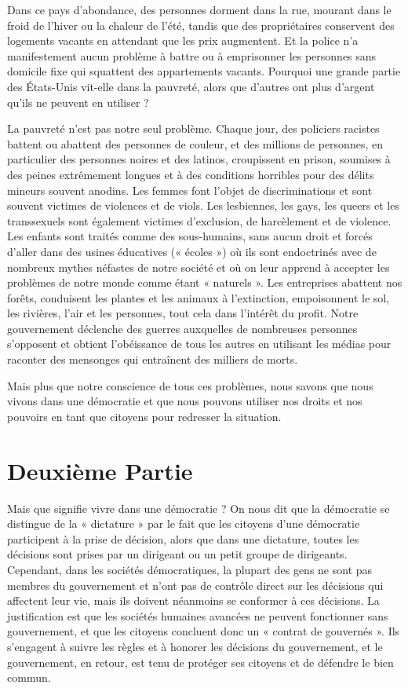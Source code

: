 Dans ce pays d'abondance, des personnes dorment dans la rue, mourant dans le froid de l'hiver ou la chaleur de l'été, tandis que des propriétaires conservent des logements vacants en attendant que les prix augmentent. Et la police n'a manifestement aucun problème à battre ou à emprisonner les personnes sans domicile fixe qui squattent des appartements vacants. Pourquoi une grande partie des États-Unis vit-elle dans la pauvreté, alors que d'autres ont plus d'argent qu'ils ne peuvent en utiliser ?

La pauvreté n'est pas notre seul problème. Chaque jour, des policiers racistes battent ou abattent des personnes de couleur, et des millions de personnes, en particulier des personnes noires et des latinos, croupissent en prison, soumises à des peines extrêmement longues et à des conditions horribles pour des délits mineurs souvent anodins. Les femmes font l'objet de discriminations et sont souvent victimes de violences et de viols. Les lesbiennes, les gays, les queers et les transsexuels sont également victimes d'exclusion, de harcèlement et de violence. Les enfants sont traités comme des sous-humains, sans aucun droit et forcés d'aller dans des usines éducatives (« écoles ») où ils sont endoctrinés avec de nombreux mythes néfastes de notre société et où on leur apprend à accepter les problèmes de notre monde comme étant « naturels ». Les entreprises abattent nos forêts, conduisent les plantes et les animaux à l'extinction, empoisonnent le sol, les rivières, l'air et les personnes, tout cela dans l'intérêt du profit. Notre gouvernement déclenche des guerres auxquelles de nombreuses personnes s'opposent et obtient l'obéissance de tous les autres en utilisant les médias pour raconter des mensonges qui entraînent des milliers de morts.

Mais plus que notre conscience de tous ces problèmes, nous savons que nous vivons dans une démocratie et que nous pouvons utiliser nos droits et nos pouvoirs en tant que citoyens pour redresser la situation.

\chapter*{\textbf{Deuxième Partie}}

Mais que signifie vivre dans une démocratie ? On nous dit que la démocratie se distingue de la « dictature » par le fait que les citoyens d'une démocratie participent à la prise de décision, alors que dans une dictature, toutes les décisions sont prises par un dirigeant ou un petit groupe de dirigeants. Cependant, dans les sociétés démocratiques, la plupart des gens ne sont pas membres du gouvernement et n'ont pas de contrôle direct sur les décisions qui affectent leur vie, mais ils doivent néanmoins se conformer à ces décisions. La justification est que les sociétés humaines avancées ne peuvent fonctionner sans gouvernement, et que les citoyens concluent donc un « contrat de gouvernés ». Ils s'engagent à suivre les règles et à honorer les décisions du gouvernement, et le gouvernement, en retour, est tenu de protéger ses citoyens et de défendre le bien commun.

